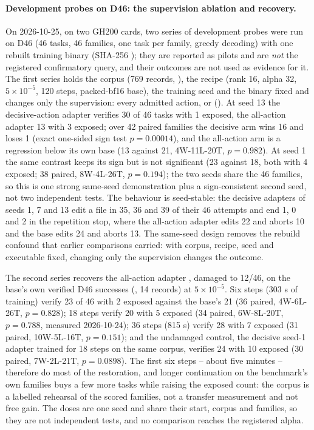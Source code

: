 \paragraph{Development probes on D46: the supervision ablation and recovery.} On 2026-10-25, on two GH200 cards, two series of development probes were run on D46 (46 tasks, 46 families, one task per family, greedy decoding) with one rebuilt training binary (SHA-256 ); they are reported as pilots and are \emph{not} the registered confirmatory query, and their outcomes are not used as evidence for it. The first series holds the corpus (769 records, ), the recipe (rank 16, alpha 32, $5\times10^{-5}$, 120 steps, packed-bf16 base), the training seed and the binary fixed and changes only the supervision: every admitted action, or  (). At seed 13 the decisive-action adapter verifies 30 of 46 tasks with 1 exposed, the all-action adapter 13 with 3 exposed; over 42 paired families the decisive arm wins 16 and loses 1 (exact one-sided sign test $p=0.00014$), and the all-action arm is a regression below its own base (13 against 21, 4W-11L-20T, $p=0.982$). At seed 1 the same contrast keeps its sign but is not significant (23 against 18, both with 4 exposed; 38 paired, 8W-4L-26T, $p=0.194$); the two seeds share the 46 families, so this is one strong same-seed demonstration plus a sign-consistent second seed, not two independent tests. The behaviour is seed-stable: the decisive adapters of seeds 1, 7 and 13 edit a file in 35, 36 and 39 of their 46 attempts and end 1, 0 and 2 in the repetition stop, where the all-action adapter edits 22 and aborts 10 and the base edits 24 and aborts 13. The same-seed design removes the rebuild confound that earlier comparisons carried: with corpus, recipe, seed and executable fixed, changing only the supervision changes the outcome.

The second series recovers the all-action adapter , damaged to 12/46, on the base's own verified D46 successes (, 14 records) at $5\times10^{-5}$. Six steps (303 s of training) verify 23 of 46 with 2 exposed against the base's 21 (36 paired, 4W-6L-26T, $p=0.828$); 18 steps verify 20 with 5 exposed (34 paired, 6W-8L-20T, $p=0.788$, measured 2026-10-24); 36 steps (815 s) verify 28 with 7 exposed (31 paired, 10W-5L-16T, $p=0.151$); and the undamaged control, the decisive seed-1 adapter trained for 18 steps on the same corpus, verifies 24 with 10 exposed (30 paired, 7W-2L-21T, $p=0.0898$). The first six steps -- about five minutes -- therefore do most of the restoration, and longer continuation on the benchmark's own families buys a few more tasks while raising the exposed count: the corpus is a labelled rehearsal of the scored families, not a transfer measurement and not free gain. The doses are one seed and share their start, corpus and families, so they are not independent tests, and no comparison reaches the registered alpha.

